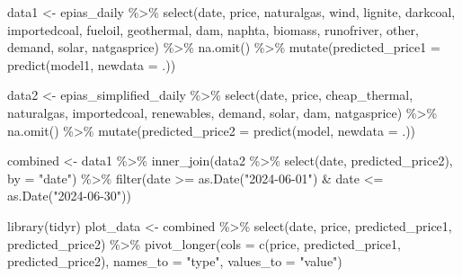 \documentclass[
  11pt,
  a4paper,
]{article}
\newenvironment{Shaded}{\begin{snugshade}}{\end{snugshade}}
\newcommand{\AttributeTok}[1]{\textcolor[rgb]{0.40,0.45,0.13}{#1}}
\newcommand{\FunctionTok}[1]{\textcolor[rgb]{0.28,0.35,0.67}{#1}}
\newcommand{\NormalTok}[1]{\textcolor[rgb]{0.00,0.23,0.31}{#1}}
\newcommand{\OtherTok}[1]{\textcolor[rgb]{0.00,0.23,0.31}{#1}}
\newcommand{\SpecialCharTok}[1]{\textcolor[rgb]{0.37,0.37,0.37}{#1}}
\newcommand{\StringTok}[1]{\textcolor[rgb]{0.13,0.47,0.30}{#1}}
\begin{document}
\begin{Shaded}
\begin{Highlighting}[]
\NormalTok{data1 }\OtherTok{\textless{}{-}}\NormalTok{ epias\_daily }\SpecialCharTok{\%\textgreater{}\%}
  \FunctionTok{select}\NormalTok{(date, price, naturalgas, wind, lignite, darkcoal, importedcoal, fueloil, geothermal, dam, naphta, biomass, runofriver, other, demand, solar, natgasprice) }\SpecialCharTok{\%\textgreater{}\%}
  \FunctionTok{na.omit}\NormalTok{() }\SpecialCharTok{\%\textgreater{}\%}
  \FunctionTok{mutate}\NormalTok{(}\AttributeTok{predicted\_price1 =} \FunctionTok{predict}\NormalTok{(model1, }\AttributeTok{newdata =}\NormalTok{ .))}

\NormalTok{data2 }\OtherTok{\textless{}{-}}\NormalTok{ epias\_simplified\_daily }\SpecialCharTok{\%\textgreater{}\%}
  \FunctionTok{select}\NormalTok{(date, price, cheap\_thermal, naturalgas, importedcoal, renewables, demand, solar, dam, natgasprice) }\SpecialCharTok{\%\textgreater{}\%}
  \FunctionTok{na.omit}\NormalTok{() }\SpecialCharTok{\%\textgreater{}\%}
  \FunctionTok{mutate}\NormalTok{(}\AttributeTok{predicted\_price2 =} \FunctionTok{predict}\NormalTok{(model, }\AttributeTok{newdata =}\NormalTok{ .))}


\NormalTok{combined }\OtherTok{\textless{}{-}}\NormalTok{ data1 }\SpecialCharTok{\%\textgreater{}\%}
  \FunctionTok{inner\_join}\NormalTok{(data2 }\SpecialCharTok{\%\textgreater{}\%} \FunctionTok{select}\NormalTok{(date, predicted\_price2), }\AttributeTok{by =} \StringTok{"date"}\NormalTok{) }\SpecialCharTok{\%\textgreater{}\%}
  \FunctionTok{filter}\NormalTok{(date }\SpecialCharTok{\textgreater{}=} \FunctionTok{as.Date}\NormalTok{(}\StringTok{"2024{-}06{-}01"}\NormalTok{) }\SpecialCharTok{\&}\NormalTok{ date }\SpecialCharTok{\textless{}=} \FunctionTok{as.Date}\NormalTok{(}\StringTok{"2024{-}06{-}30"}\NormalTok{))}


\FunctionTok{library}\NormalTok{(tidyr)}
\NormalTok{plot\_data }\OtherTok{\textless{}{-}}\NormalTok{ combined }\SpecialCharTok{\%\textgreater{}\%}
  \FunctionTok{select}\NormalTok{(date, price, predicted\_price1, predicted\_price2) }\SpecialCharTok{\%\textgreater{}\%}
  \FunctionTok{pivot\_longer}\NormalTok{(}\AttributeTok{cols =} \FunctionTok{c}\NormalTok{(price, predicted\_price1, predicted\_price2),}
               \AttributeTok{names\_to =} \StringTok{"type"}\NormalTok{, }\AttributeTok{values\_to =} \StringTok{"value"}\NormalTok{)}



\end{Highlighting}
\end{Shaded}
\end{document}
